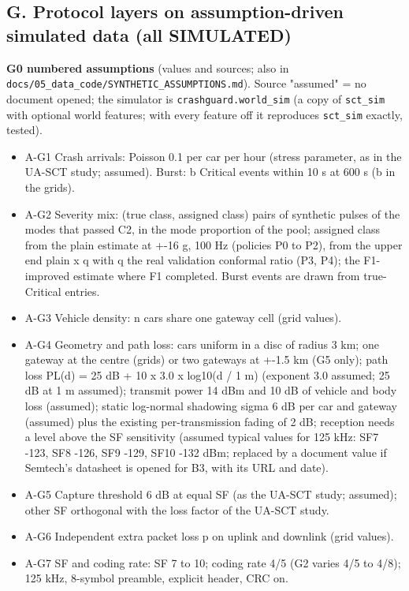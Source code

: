 \subsection*{G. Protocol layers on assumption-driven simulated data (all SIMULATED)}

\textbf{G0 numbered assumptions} (values and sources; also in \texttt{docs/05\_data\_code/SYNTHETIC\_ASSUMPTIONS.md}). Source "assumed" = no document opened; the simulator is \texttt{crashguard.world\_sim} (a copy of \texttt{sct\_sim} with optional world features; with every feature off it reproduces \texttt{sct\_sim} exactly, tested).
\begin{itemize}
\item A-G1 Crash arrivals: Poisson 0.1 per car per hour (stress parameter, as in the UA-SCT study; assumed). Burst: b Critical events within 10 s at 600 s (b in the grids).
\item A-G2 Severity mix: (true class, assigned class) pairs of synthetic pulses of the modes that passed C2, in the mode proportion of the pool; assigned class from the plain estimate at +-16 g, 100 Hz (policies P0 to P2), from the upper end plain x q with q the real validation conformal ratio (P3, P4); the F1-improved estimate where F1 completed. Burst events are drawn from true-Critical entries.
\item A-G3 Vehicle density: n cars share one gateway cell (grid values).
\item A-G4 Geometry and path loss: cars uniform in a disc of radius 3 km; one gateway at the centre (grids) or two gateways at +-1.5 km (G5 only); path loss PL(d) = 25 dB + 10 x 3.0 x log10(d / 1 m) (exponent 3.0 assumed; 25 dB at 1 m assumed); transmit power 14 dBm and 10 dB of vehicle and body loss (assumed); static log-normal shadowing sigma 6 dB per car and gateway (assumed) plus the existing per-transmission fading of 2 dB; reception needs a level above the SF sensitivity (assumed typical values for 125 kHz: SF7 -123, SF8 -126, SF9 -129, SF10 -132 dBm; replaced by a document value if Semtech's datasheet is opened for B3, with its URL and date).
\item A-G5 Capture threshold 6 dB at equal SF (as the UA-SCT study; assumed); other SF orthogonal with the loss factor of the UA-SCT study.
\item A-G6 Independent extra packet loss p on uplink and downlink (grid values).
\item A-G7 SF and coding rate: SF 7 to 10; coding rate 4/5 (G2 varies 4/5 to 4/8); 125 kHz, 8-symbol preamble, explicit header, CRC on.

\end{itemize}
